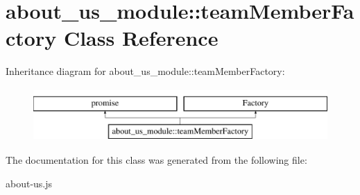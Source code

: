 \hypertarget{classabout__us__module_1_1teamMemberFactory}{\section{about\-\_\-us\-\_\-module\-:\-:team\-Member\-Factory Class Reference}
\label{classabout__us__module_1_1teamMemberFactory}
}
Inheritance diagram for about\-\_\-us\-\_\-module\-:\-:team\-Member\-Factory\-:\begin{figure}[H]
\begin{center}
\leavevmode
\includegraphics[height=2.000000cm]{classabout__us__module_1_1teamMemberFactory}
\end{center}
\end{figure}


The documentation for this class was generated from the following file\-:\begin{DoxyCompactItemize}
\item 
about-\/us.\-js\end{DoxyCompactItemize}

